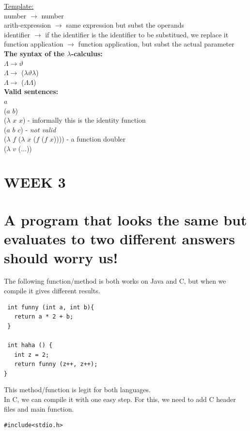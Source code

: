 \documentclass{article}
\begin{document}
\begin{flushleft}
\begin{flushleft}
\underline{Template:}\\
number $\rightarrow$ number\\
arith-expression $\rightarrow$ same expression but subst the operands\\
identifier $\rightarrow$ if the identifier is the identifier to be substitued, we replace it\\
function application $\rightarrow$ function application, but subst the actual parameter\\
\bigskip
\textbf{The syntax of the $\lambda$-calculus:}\\
$\Lambda \rightarrow \vartheta$ \\
$\Lambda \rightarrow$ ($\lambda \vartheta \lambda$)\\
$\Lambda \rightarrow$ ($\Lambda \Lambda$)\\
\textbf{Valid sentences:}\\
$\mathit{a}$\\
($\mathit{a}$ $\mathit{b}$)\\
($\lambda$ $\mathit{x}$ $\mathit{x}$) - informally this is the identity function\\
($\mathit{a}$ $\mathit{b}$ $\mathit{c}$) - \textit{not valid}\\
($\lambda$ $\mathit{f}$ ($\lambda$ $\mathit{x}$ ($\mathit{f}$ ($\mathit{f}$ $\mathit{x}$)))) - a function doubler\\
($\lambda$ $\mathit{v}$ ($\mathit{...}$))
\end{flushleft}
\pagebreak

\section*{WEEK 3}
\section*{A program that looks the same but evaluates to two different answers should worry us!}
\begin{flushleft}
The following function/method is both works on Java and C, but when we compile it gives different results.
\begin{verbatim}
 int funny (int a, int b){
   return a * 2 + b;
 }

 int haha () {
   int z = 2;
   return funny (z++, z++);
}
\end{verbatim}
This method/function is legit for both languages.\\
\bigskip
In C, we can compile it with one easy step. For this, we need to add C header files and main function.
\begin{verbatim}
#include<stdio.h>


\end{verbatim}
\end{flushleft}
\end{flushleft}
\end{document}
